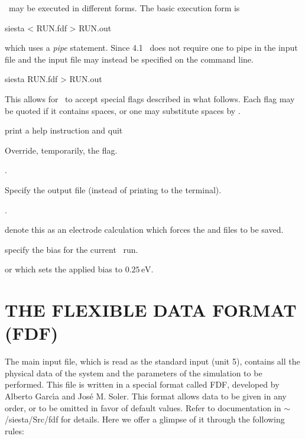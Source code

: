 \siesta\ may be executed in different forms. The basic execution form
is
\begin{shellexample}
  siesta < RUN.fdf > RUN.out
\end{shellexample}
which uses a \emph{pipe} statement. 
%
Since 4.1 \siesta\ does not require one to pipe in the input file and
the input file may instead be specified on the command line.
\begin{shellexample}
  siesta RUN.fdf > RUN.out
\end{shellexample}
This allows for \siesta\ to accept special flags described in what
follows. Each flag may be quoted if it contains spaces, or one may
substitute spaces by \fdf*{:}.
\begin{fdfoptions}

  \option[-h]%
  print a help instruction and quit

  \option[-L]%
  Override, temporarily, the  flag. 

  .

  \option[-out|-o]%
  Specify the output file (instead of printing to the terminal).

  .

  denote this as an electrode calculation which forces the
   and  files to be saved.

  \option[-V]%
  specify the bias for the current \tsiesta\ run.

   or 
  which sets the applied bias to $0.25\,\mathrm{eV}$.

\end{fdfoptions}


\section{THE FLEXIBLE DATA FORMAT (FDF)}

The main input file,
which is read as the standard input (unit 5),
contains all the physical data of the system and the parameters of
the simulation to be performed.
This file is written in a special format called FDF, developed by
Alberto Garc\'{\i}a and Jos\'e M. Soler. This format allows data to be
given in any order, or to be omitted in favor of default values.
Refer to documentation in $\sim$/siesta/Src/fdf for details.
Here we offer a glimpse of it through the following rules:

